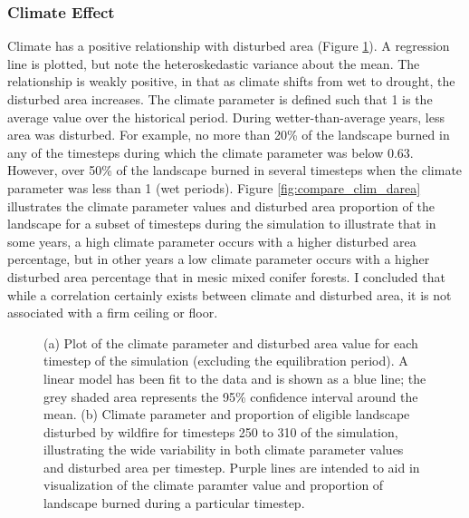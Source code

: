 
\subsubsection*{Climate Effect} 
Climate has a positive relationship with disturbed area (Figure \ref{fig:climate_darea}). A regression line is plotted, but note the heteroskedastic variance about the mean. The relationship is weakly positive, in that as climate shifts from wet to drought, the disturbed area increases. The climate parameter is defined such that 1 is the average value over the historical period. During wetter-than-average years, less area was disturbed. For example, no more than 20\% of the landscape burned in any of the timesteps during which the climate parameter was below 0.63. However, over 50\% of the landscape burned in several timesteps when the climate parameter was less than 1 (wet periods). Figure \ref{fig:compare_clim_darea} illustrates the climate parameter values and disturbed area proportion of the landscape for a subset of timesteps during the simulation to illustrate that in some years, a high climate parameter occurs with a higher disturbed area percentage, but in other years a low climate parameter occurs with a higher disturbed area percentage that in mesic mixed conifer forests. I concluded that while a correlation certainly exists between climate and disturbed area, it is not associated with a firm ceiling or floor.

\begin{figure}[!htbp]
  \centering
  \caption{(a) Plot of the climate parameter and disturbed area value for each timestep of the simulation (excluding the equilibration period). A linear model has been fit to the data and is shown as a blue line; the grey shaded area represents the 95\% confidence interval around the mean. (b) Climate parameter and proportion of eligible landscape disturbed by wildfire for timesteps 250 to 310 of the simulation, illustrating the wide variability in both climate parameter values and disturbed area per timestep. Purple lines are intended to aid in visualization of the climate paramter value and proportion of landscape burned during a particular timestep.}
  \label{fig:climate_darea}
\end{figure}


